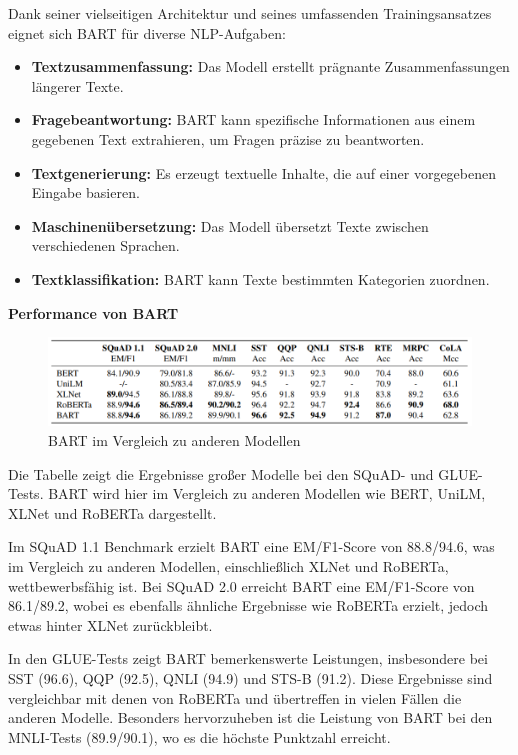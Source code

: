 \documentclass[12pt,a4paper,twoside]{article}
\begin{document}
Dank seiner vielseitigen Architektur und seines umfassenden Trainingsansatzes eignet sich BART für diverse NLP-Aufgaben:

\begin{itemize}
    \item \textbf{Textzusammenfassung:} Das Modell erstellt prägnante Zusammenfassungen längerer Texte.
    \item \textbf{Fragebeantwortung:} BART kann spezifische Informationen aus einem gegebenen Text extrahieren, um Fragen präzise zu beantworten.
    \item \textbf{Textgenerierung:} Es erzeugt textuelle Inhalte, die auf einer vorgegebenen Eingabe basieren.
    \item \textbf{Maschinenübersetzung:} Das Modell übersetzt Texte zwischen verschiedenen Sprachen.
    \item \textbf{Textklassifikation:} BART kann Texte bestimmten Kategorien zuordnen.
\end{itemize}

\textbf{Performance von BART}\\
\begin{figure}[H]
    \centering
    \includegraphics[width=0.6\linewidth]{BART-performance.png}
    \caption{BART im Vergleich zu anderen Modellen}
    \label{fig:1}
\end{figure}

Die Tabelle zeigt die Ergebnisse großer Modelle bei den SQuAD- und GLUE-Tests. BART wird hier im Vergleich zu anderen Modellen wie BERT, UniLM, XLNet und RoBERTa dargestellt. 

Im SQuAD 1.1 Benchmark erzielt BART eine EM/F1-Score von 88.8/94.6, was im Vergleich zu anderen Modellen, einschließlich XLNet und RoBERTa, wettbewerbsfähig ist. Bei SQuAD 2.0 erreicht BART eine EM/F1-Score von 86.1/89.2, wobei es ebenfalls ähnliche Ergebnisse wie RoBERTa erzielt, jedoch etwas hinter XLNet zurückbleibt.

In den GLUE-Tests zeigt BART bemerkenswerte Leistungen, insbesondere bei SST (96.6), QQP (92.5), QNLI (94.9) und STS-B (91.2). Diese Ergebnisse sind vergleichbar mit denen von RoBERTa und übertreffen in vielen Fällen die anderen Modelle. Besonders hervorzuheben ist die Leistung von BART bei den MNLI-Tests (89.9/90.1), wo es die höchste Punktzahl erreicht.
\end{document}
